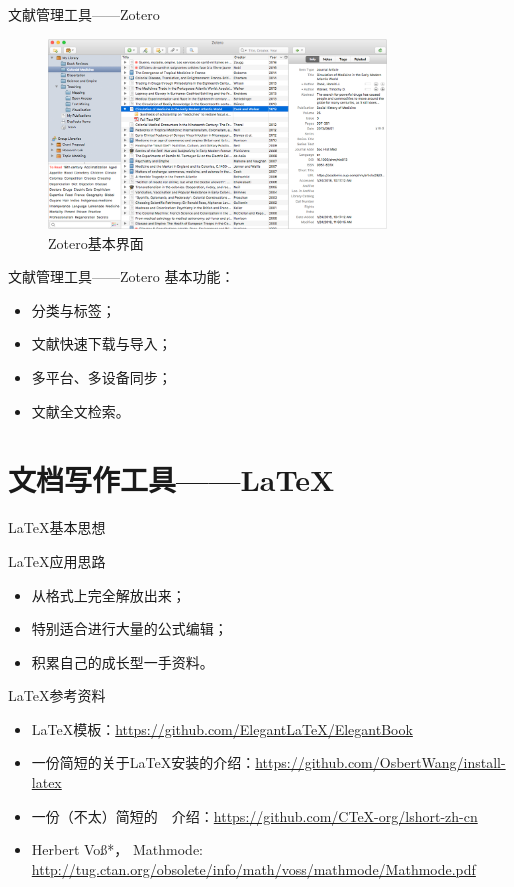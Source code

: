 \documentclass[xcolor=x11names,compress,10pt]{ctexbeamer}
\begin{document}
\begin{frame}{文献管理工具——Zotero}
\begin{figure}[h!]
\centering
\includegraphics[width=0.8\textwidth]{pictures/zotero.png}
\caption{Zotero基本界面}
\end{figure}
\end{frame}


\begin{frame}{文献管理工具——Zotero}
基本功能：
\begin{itemize}
\item 分类与标签；
\item 文献快速下载与导入；
\item 多平台、多设备同步；
\item 文献全文检索。
\end{itemize}
\end{frame}


\section[\LaTeX]{文档写作工具——\LaTeX}
\begin{frame}{\LaTeX 基本思想}

\end{frame}

\begin{frame}{\LaTeX 应用思路}
\begin{itemize}
\item 从格式上完全解放出来；
\item 特别适合进行大量的公式编辑；
\item 积累自己的成长型一手资料。
\end{itemize}
\end{frame}



\begin{frame}{\LaTeX 参考资料}
\begin{itemize}
\item \LaTeX{}模板：\url{https://github.com/ElegantLaTeX/ElegantBook}
\item 一份简短的关于\LaTeX{}安装的介绍：\url{https://github.com/OsbertWang/install-latex}
\item 一份（不太）简短的~\LaTeXe{}~介绍：\url{https://github.com/CTeX-org/lshort-zh-cn}
\item Herbert Voß*，  Mathmode: \url{http://tug.ctan.org/obsolete/info/math/voss/mathmode/Mathmode.pdf}
\end{itemize}
\end{frame}
\end{document}
